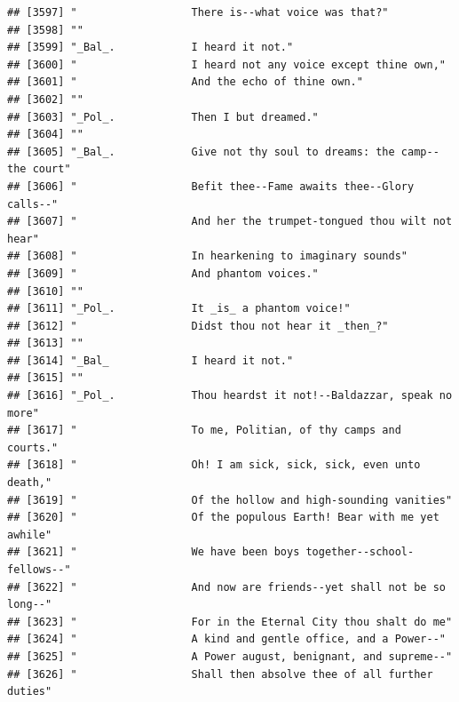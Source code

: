 \documentclass{article}\usepackage[]{graphicx}\usepackage[]{color}
\makeatletter
\newenvironment{kframe}{%
 \def\at@end@of@kframe{}%
 \ifinner\ifhmode%
  \def\at@end@of@kframe{\end{minipage}}%
  \begin{minipage}{\columnwidth}%
 \fi\fi%
 \def\FrameCommand##1{\hskip\@totalleftmargin \hskip-\fboxsep
 \colorbox{shadecolor}{##1}\hskip-\fboxsep
     \hskip-\linewidth \hskip-\@totalleftmargin \hskip\columnwidth}%
 \MakeFramed {\advance\hsize-\width
   \@totalleftmargin\z@ \linewidth\hsize
   \@setminipage}}%
 {\par\unskip\endMakeFramed%
 \at@end@of@kframe}
\newenvironment{knitrout}{}{} %
\makeatother
\begin{document}
\begin{knitrout}
\begin{kframe}
\begin{verbatim}
## [3597] "                  There is--what voice was that?"                            
## [3598] ""                                                                            
## [3599] "_Bal_.            I heard it not."                                           
## [3600] "                  I heard not any voice except thine own,"                   
## [3601] "                  And the echo of thine own."                                
## [3602] ""                                                                            
## [3603] "_Pol_.            Then I but dreamed."                                       
## [3604] ""                                                                            
## [3605] "_Bal_.            Give not thy soul to dreams: the camp--the court"          
## [3606] "                  Befit thee--Fame awaits thee--Glory calls--"               
## [3607] "                  And her the trumpet-tongued thou wilt not hear"            
## [3608] "                  In hearkening to imaginary sounds"                         
## [3609] "                  And phantom voices."                                       
## [3610] ""                                                                            
## [3611] "_Pol_.            It _is_ a phantom voice!"                                  
## [3612] "                  Didst thou not hear it _then_?"                            
## [3613] ""                                                                            
## [3614] "_Bal_             I heard it not."                                           
## [3615] ""                                                                            
## [3616] "_Pol_.            Thou heardst it not!--Baldazzar, speak no more"            
## [3617] "                  To me, Politian, of thy camps and courts."                 
## [3618] "                  Oh! I am sick, sick, sick, even unto death,"               
## [3619] "                  Of the hollow and high-sounding vanities"                  
## [3620] "                  Of the populous Earth! Bear with me yet awhile"            
## [3621] "                  We have been boys together--school-fellows--"              
## [3622] "                  And now are friends--yet shall not be so long--"           
## [3623] "                  For in the Eternal City thou shalt do me"                  
## [3624] "                  A kind and gentle office, and a Power--"                   
## [3625] "                  A Power august, benignant, and supreme--"                  
## [3626] "                  Shall then absolve thee of all further duties"             

\end{verbatim}
\end{kframe}
\end{knitrout}
\end{document}
